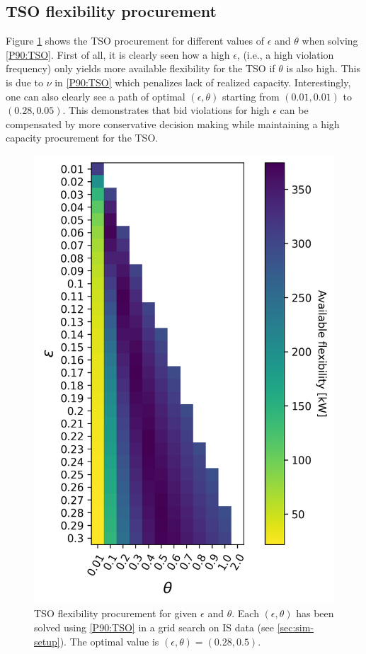 \documentclass[conference]{IEEEtran}
\begin{document}
\subsection{\ac{TSO} flexibility procurement}\label{sec:motivation}

Figure \ref{fig:tso} shows the \ac{TSO} procurement for different values of $\epsilon$ and $\theta$ when solving \eqref{P90:TSO}. First of all, it is clearly seen how a high $\epsilon$, (i.e., a high violation frequency) only yields more available flexibility for the \ac{TSO} if $\theta$ is also high. This is due to $\nu$ in \eqref{P90:TSO} which penalizes lack of realized capacity. Interestingly, one can also clearly see a path of optimal $(\epsilon, \theta)$ starting from $(0.01, 0.01)$ to $(0.28, 0.05)$. This demonstrates that bid violations for high $\epsilon$ can be compensated by more conservative decision making while maintaining a high capacity procurement for the \ac{TSO}.

\begin{figure}[!t]
    \centering
    \includegraphics[width=0.95\columnwidth]{../figures/heatmap.png}
    \caption{\ac{TSO} flexibility procurement for given $\epsilon$ and $\theta$. Each $(\epsilon, \theta)$ has been solved using \eqref{P90:TSO} in a grid search on \ac{IS} data (see \ref{sec:sim-setup}). The optimal value is $(\epsilon, \theta) = (0.28, 0.5)$. }
    \label{fig:tso}
\end{figure}
\end{document}
